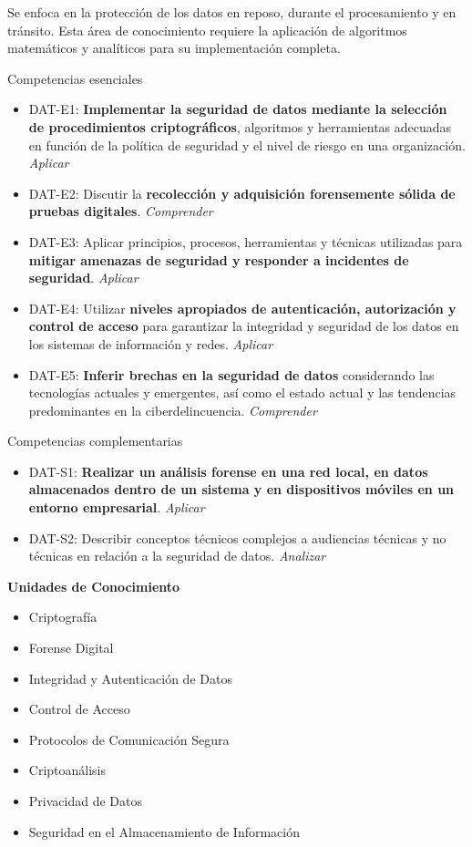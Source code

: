 \newpage
\begin{tcolorbox}
[colback=gray!5!white,colframe=blue!10!gray,title=Seguridad de Datos] 
Se enfoca en la protección de los datos en reposo, durante el procesamiento y en tránsito. Esta área de conocimiento requiere la aplicación de algoritmos matemáticos y analíticos para su implementación completa.\end{tcolorbox}
Competencias esenciales
\begin{itemize}
    \item  DAT-E1: \textbf{Implementar la seguridad de datos mediante la selección de procedimientos criptográficos}, algoritmos y herramientas adecuadas en función de la política de seguridad y el nivel de riesgo en una organización. \textit{Aplicar}
    \item  DAT-E2: Discutir la \textbf{recolección y adquisición forensemente sólida de pruebas digitales}. \textit{Comprender}
    \item  DAT-E3: Aplicar principios, procesos, herramientas y técnicas utilizadas para \textbf{mitigar amenazas de seguridad y responder a incidentes de seguridad}. \textit{Aplicar}
    \item  DAT-E4: Utilizar \textbf{niveles apropiados de autenticación, autorización y control de acceso} para garantizar la integridad y seguridad de los datos en los sistemas de información y redes. \textit{Aplicar}
    \item  DAT-E5: \textbf{Inferir brechas en la seguridad de datos }considerando las tecnologías actuales y emergentes, así como el estado actual y las tendencias predominantes en la ciberdelincuencia. \textit{Comprender}
\end{itemize}
Competencias complementarias
\begin{itemize}
\item DAT-S1: \textbf{Realizar un análisis forense en una red local, en datos almacenados dentro de un sistema y en dispositivos móviles en un entorno empresarial}. \textit{Aplicar}
\item  DAT-S2: Describir conceptos técnicos complejos a audiencias técnicas y no técnicas en relación a la seguridad de datos. \textit{Analizar}
\end{itemize}
\textbf{Unidades de Conocimiento}
\begin{itemize}
\item Criptografía
\item Forense Digital
\item Integridad y Autenticación de Datos
\item Control de Acceso
\item Protocolos de Comunicación Segura
\item Criptoanálisis
\item Privacidad de Datos
\item Seguridad en el Almacenamiento de Información
\end{itemize}
\newpage 


